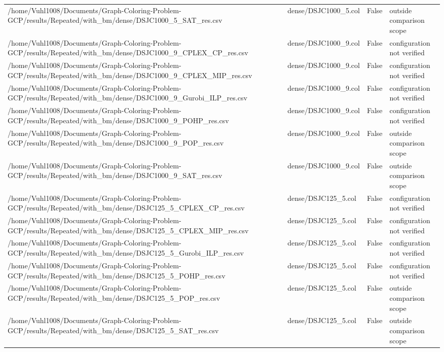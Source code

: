 \begin{table}[htbp]
\begin{tabular}{llll}
/home/Vuhl1008/Documents/Graph-Coloring-Problem-GCP/results/Repeated/with\_bm/dense/DSJC1000\_5\_SAT\_res.csv & dense/DSJC1000\_5.col & False & outside comparison scope \\
/home/Vuhl1008/Documents/Graph-Coloring-Problem-GCP/results/Repeated/with\_bm/dense/DSJC1000\_9\_CPLEX\_CP\_res.csv & dense/DSJC1000\_9.col & False & configuration not verified \\
/home/Vuhl1008/Documents/Graph-Coloring-Problem-GCP/results/Repeated/with\_bm/dense/DSJC1000\_9\_CPLEX\_MIP\_res.csv & dense/DSJC1000\_9.col & False & configuration not verified \\
/home/Vuhl1008/Documents/Graph-Coloring-Problem-GCP/results/Repeated/with\_bm/dense/DSJC1000\_9\_Gurobi\_ILP\_res.csv & dense/DSJC1000\_9.col & False & configuration not verified \\
/home/Vuhl1008/Documents/Graph-Coloring-Problem-GCP/results/Repeated/with\_bm/dense/DSJC1000\_9\_POHP\_res.csv & dense/DSJC1000\_9.col & False & configuration not verified \\
/home/Vuhl1008/Documents/Graph-Coloring-Problem-GCP/results/Repeated/with\_bm/dense/DSJC1000\_9\_POP\_res.csv & dense/DSJC1000\_9.col & False & outside comparison scope \\
/home/Vuhl1008/Documents/Graph-Coloring-Problem-GCP/results/Repeated/with\_bm/dense/DSJC1000\_9\_SAT\_res.csv & dense/DSJC1000\_9.col & False & outside comparison scope \\
/home/Vuhl1008/Documents/Graph-Coloring-Problem-GCP/results/Repeated/with\_bm/dense/DSJC125\_5\_CPLEX\_CP\_res.csv & dense/DSJC125\_5.col & False & configuration not verified \\
/home/Vuhl1008/Documents/Graph-Coloring-Problem-GCP/results/Repeated/with\_bm/dense/DSJC125\_5\_CPLEX\_MIP\_res.csv & dense/DSJC125\_5.col & False & configuration not verified \\
/home/Vuhl1008/Documents/Graph-Coloring-Problem-GCP/results/Repeated/with\_bm/dense/DSJC125\_5\_Gurobi\_ILP\_res.csv & dense/DSJC125\_5.col & False & configuration not verified \\
/home/Vuhl1008/Documents/Graph-Coloring-Problem-GCP/results/Repeated/with\_bm/dense/DSJC125\_5\_POHP\_res.csv & dense/DSJC125\_5.col & False & configuration not verified \\
/home/Vuhl1008/Documents/Graph-Coloring-Problem-GCP/results/Repeated/with\_bm/dense/DSJC125\_5\_POP\_res.csv & dense/DSJC125\_5.col & False & outside comparison scope \\
/home/Vuhl1008/Documents/Graph-Coloring-Problem-GCP/results/Repeated/with\_bm/dense/DSJC125\_5\_SAT\_res.csv & dense/DSJC125\_5.col & False & outside comparison scope \\

\end{tabular}
\end{table}
